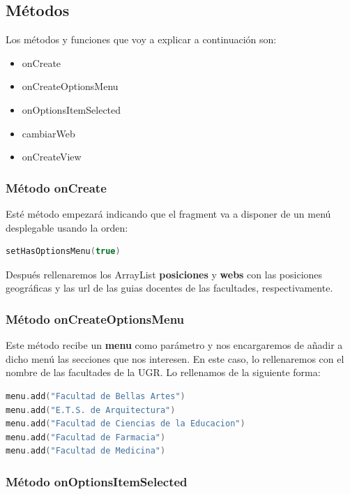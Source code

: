 \newpage

\subsection{Métodos}

Los métodos y funciones que voy a explicar a continuación son:

\begin{itemize}
\item{onCreate}
\item{onCreateOptionsMenu}
\item{onOptionsItemSelected}
\item{cambiarWeb}
\item{onCreateView}
\end{itemize}

\subsubsection{Método onCreate}

Esté método empezará indicando que el fragment va a disponer de un menú desplegable usando la orden:

\begin{lstlisting}[language=Kotlin]
setHasOptionsMenu(true)
\end{lstlisting}

Después rellenaremos los ArrayList \textbf{posiciones} y \textbf{webs} con las posiciones geográficas y las url de las guias docentes de las facultades, respectivamente.

\subsubsection{Método onCreateOptionsMenu}

Este método recibe un \textbf{menu} como parámetro y nos encargaremos de añadir a dicho menú las secciones que nos interesen. En este caso, lo rellenaremos con el nombre de las facultades de la UGR. Lo rellenamos de la siguiente forma:

\begin{lstlisting}[language=Kotlin]
menu.add("Facultad de Bellas Artes")
menu.add("E.T.S. de Arquitectura")
menu.add("Facultad de Ciencias de la Educacion")
menu.add("Facultad de Farmacia")
menu.add("Facultad de Medicina")
\end{lstlisting}

\newpage

\subsubsection{Método onOptionsItemSelected}

